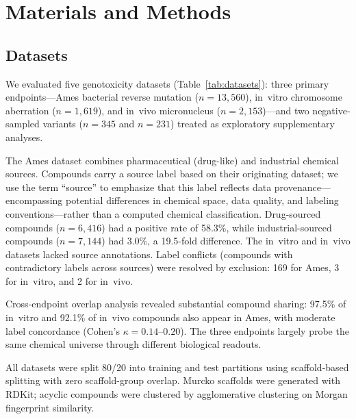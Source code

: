 \section{Materials and Methods}

\subsection{Datasets}

We evaluated five genotoxicity datasets (Table~\ref{tab:datasets}): three primary endpoints---Ames bacterial reverse mutation ($n = 13{,}560$), in~vitro chromosome aberration ($n = 1{,}619$), and in~vivo micronucleus ($n = 2{,}153$)---and two negative-sampled variants ($n = 345$ and $n = 231$) treated as exploratory supplementary analyses.

The Ames dataset combines pharmaceutical (drug-like) and industrial chemical sources. Compounds carry a source label based on their originating dataset; we use the term ``source'' to emphasize that this label reflects data provenance---encompassing potential differences in chemical space, data quality, and labeling conventions---rather than a computed chemical classification. Drug-sourced compounds ($n = 6{,}416$) had a positive rate of 58.3\%, while industrial-sourced compounds ($n = 7{,}144$) had 3.0\%, a 19.5-fold difference. The in~vitro and in~vivo datasets lacked source annotations. Label conflicts (compounds with contradictory labels across sources) were resolved by exclusion: 169 for Ames, 3 for in~vitro, and 2 for in~vivo.

Cross-endpoint overlap analysis revealed substantial compound sharing: 97.5\% of in~vitro and 92.1\% of in~vivo compounds also appear in Ames, with moderate label concordance (Cohen's $\kappa = 0.14$--$0.20$). The three endpoints largely probe the same chemical universe through different biological readouts.

All datasets were split 80/20 into training and test partitions using scaffold-based splitting\cite{Sheridan_2013} with zero scaffold-group overlap. Murcko scaffolds\cite{Bemis_Murcko_1996} were generated with RDKit;\cite{RDKit} acyclic compounds were clustered by agglomerative clustering on Morgan fingerprint\cite{Rogers_Hahn_2010} similarity.

